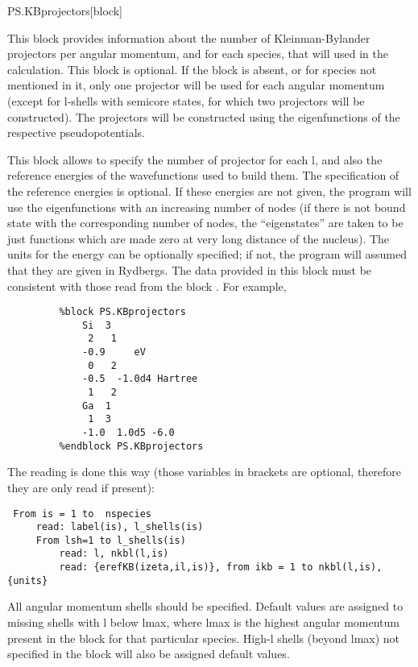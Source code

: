 \begin{fdfentry}{PS.KBprojectors}[block]

  This block provides
  information about the number of Kleinman-Bylander projectors per
  angular momentum, and for each species, that will used in the
  calculation. This block is optional.  If the block is absent, or for
  species not mentioned in it, only one projector will be used for
  each angular momentum (except for l-shells with semicore states, for
  which two projectors will be constructed). The projectors will be
  constructed using the eigenfunctions of the respective
  pseudopotentials.


This block allows to specify the number of projector for each l, and also
the reference energies of the wavefunctions used to build them.
The specification of the reference energies is optional. If these
energies are not given, the program will use the eigenfunctions with an
increasing number of nodes (if there is not bound state with
the corresponding number of nodes, the ``eigenstates'' are taken to be just
functions which are made zero at very long distance of the nucleus).
The units for the energy can be optionally specified; if not, the
program will assumed that they are given in Rydbergs.
The data provided in this block must be consistent with those
read from the block . For example,

\begin{verbatim}
         %block PS.KBprojectors
             Si  3
              2   1
             -0.9     eV
              0   2
             -0.5  -1.0d4 Hartree
              1   2
             Ga  1
              1  3
             -1.0  1.0d5 -6.0
         %endblock PS.KBprojectors
\end{verbatim}

The reading is done this way (those variables in brackets are optional,
therefore they are only read if present):

\begin{verbatim}
 From is = 1 to  nspecies
     read: label(is), l_shells(is)
     From lsh=1 to l_shells(is)
         read: l, nkbl(l,is)
         read: {erefKB(izeta,il,is)}, from ikb = 1 to nkbl(l,is), {units}
\end{verbatim}

All angular momentum shells should be specified.  Default values are
assigned to missing shells with l below lmax, where lmax is the
highest angular momentum present in the block for that particular
species. High-l shells (beyond lmax) not specified in the block will
also be assigned default values.


\end{fdfentry}
